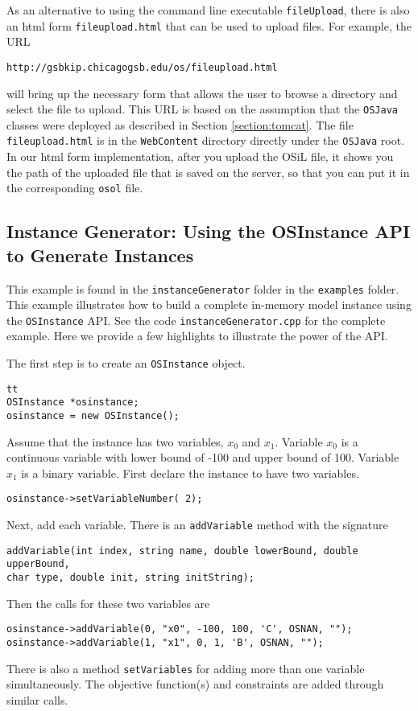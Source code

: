 \documentclass[11pt]{article}
\renewcommand{\_}{{\char"5F}}
\renewcommand{\{}{{\char"7B}}
\renewcommand{\}}{{\char"7D}}
\renewcommand{\^}{{\char"0D}}
\renewcommand{\'}{{\char"0D}}
\begin{document}
As an alternative to using the command line executable {\tt fileUpload}, there is also an html form {\tt fileupload.html} that can be used to upload files. For example, the URL
\begin{verbatim}
http://gsbkip.chicagogsb.edu/os/fileupload.html
\end{verbatim}
will bring up the necessary form that allows the user to browse a directory and select the file to upload. This URL is based on the assumption that the {\tt OSJava} classes were deployed as described in Section \ref{section:tomcat}. The file {\tt fileupload.html} is in the {\tt WebContent} directory directly under the
{\tt OSJava} root. In our html form implementation, after you upload the OSiL file, it shows you the path of the uploaded file that is saved on the server, so that you can put it in the corresponding {\tt osol} file.




\subsection{Instance Generator: Using the OSInstance API to Generate Instances}\label{subsection:exampleOSInstanceGeneration}

This example is found in the {\tt instanceGenerator} folder in the {\tt examples} folder.  This example illustrates how to build a complete in-memory model instance using the {\tt OSInstance} API.   See the code {\tt instanceGenerator.cpp} for the complete example. Here we provide a few highlights to illustrate the power of the API.

The first step is to create an {\tt OSInstance} object.
\begin{verbatim}tt
OSInstance *osinstance;
osinstance = new OSInstance();
\end{verbatim}

Assume that the instance has two variables, $x_{0}$ and $x_{1}.$ Variable $x_{0}$ is a continuous variable with lower bound of -100 and upper bound of 100. Variable $x_{1}$ is a binary variable. First declare the instance to have two variables.
\begin{verbatim}
osinstance->setVariableNumber( 2);
\end{verbatim}
Next, add each variable. There is an {\tt addVariable} method with the signature
\begin{verbatim}
addVariable(int index, string name, double lowerBound, double upperBound,
char type, double init, string initString);
\end{verbatim}
Then the calls for these two variables are
\begin{verbatim}
osinstance->addVariable(0, "x0", -100, 100, 'C', OSNAN, "");
osinstance->addVariable(1, "x1", 0, 1, 'B', OSNAN, "");
\end{verbatim}
There is also a method {\tt setVariables} for adding more than one variable simultaneously.  The objective function(s) and constraints are added through similar calls.
\end{document}

